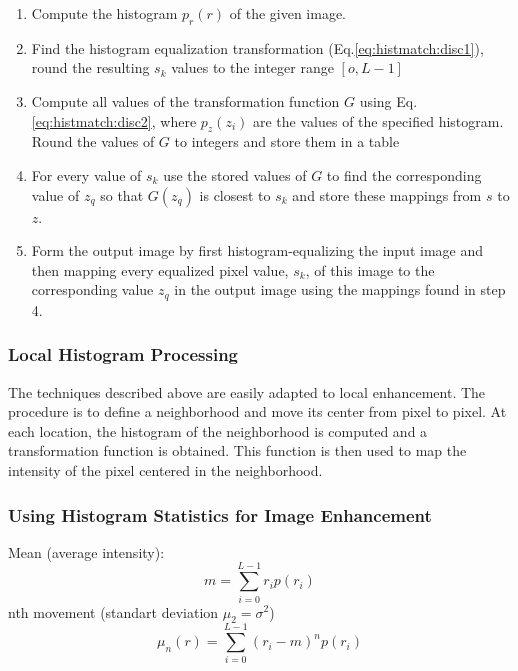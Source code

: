 \begin{enumerate}
  \item Compute the histogram $p_r(r)$ of the given image.
  \item Find the histogram equalization transformation (Eq.\ref{eq:histmatch:disc1}), round the resulting $s_k$
  	values to the integer range $[o, L-1]$
  \item Compute all values of the transformation function $G$ using Eq.\ref{eq:histmatch:disc2}, where $p_z(z_i)$ are the values
  	of the specified histogram. Round the values of $G$ to integers and store them in a table
  \item For every value of $s_k$ use the stored values of $G$ to find the corresponding value of $z_q$ so that $G(z_q)$ is 
  	closest to $s_k$ and store these mappings from $s$ to $z$.
  \item Form the output image by first histogram-equalizing the input image and then mapping every equalized pixel value, $s_k$, of this
  	image to the corresponding value $z_q$ in the output image using the mappings found in step 4.
\end{enumerate}


\subsubsection{Local Histogram Processing }
The techniques described above are easily adapted to local enhancement. The procedure is to define a neighborhood and move its center from pixel to pixel.
At each location, the histogram of the neighborhood is computed and a transformation function is obtained. This function is then used to map the intensity
of the pixel centered in the neighborhood.


\subsubsection{Using Histogram Statistics for Image Enhancement }
    Mean (average intensity):
    \begin{equation}
        m = \sum\limits_{i=0}^{L-1}r_i p(r_i)
    \end{equation}
    nth movement (standart deviation $\mu_2 = \sigma^2$)
    \begin{equation}
        \mu_n(r) = \sum\limits_{i=0}^{L-1}(r_i -m)^n p(r_i)
    \end{equation}

